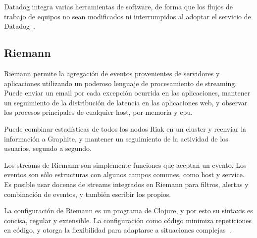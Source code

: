 Datadog integra varias herramientas de software, de forma que los flujos de
trabajo de equipos no sean modificados ni interrumpidos al adoptar el servicio
de Datadog~\cite{datadog}.

\subsection{Riemann}

Riemann permite la agregación de eventos provenientes de servidores y
aplicaciones utilizando un poderoso lenguaje de procesamiento de streaming.
Puede enviar un email por cada excepción ocurrida en las aplicaciones, mantener
un seguimiento de la distribución de latencia en las aplicaciones web, y
observar los procesos principales de cualquier host, por memoria y cpu.

Puede combinar estadísticas de todos los nodos Riak en un cluster y reenviar la
información a Graphite, y mantener un seguimiento de la actividad de los
usuarios, segundo a segundo.

Los streams de Riemann son simplemente funciones que aceptan un evento. Los
eventos son sólo estructuras con algunos campos comunes, como host y service.
Es posible usar docenas de streams integrados en Riemann para filtros, alertas
y combinación de eventos, y también escribir los propios.

La configuración de Riemann es un programa de Clojure, y por esto su sintaxis
es concisa, regular y extensible. La configuración como código minimiza
repeticiones en código, y otorga la flexibilidad para adaptarse a situaciones
complejas~\cite{riemann}.

